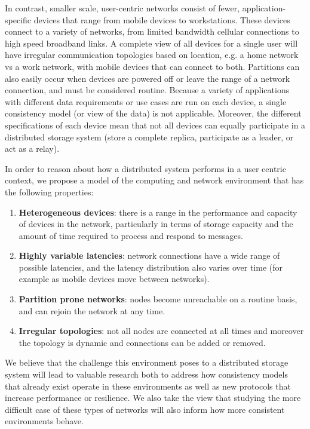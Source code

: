 \documentclass[letterpaper,twocolumn,10pt]{article}
\begin{document}
In contrast, smaller scale, user-centric networks consist of fewer, application-specific devices that range from mobile devices to workstations. These devices connect to a variety of networks, from limited bandwidth cellular connections to high speed broadband links. A complete view of all devices for a single user will have irregular communication topologies based on location, e.g. a home network vs a work network, with mobile devices that can connect to both. Partitions can also easily occur when devices are powered off or leave the range of a network connection, and must be considered routine. Because a variety of applications with different data requirements or use cases are run on each device, a single consistency model (or view of the data) is not applicable. Moreover, the different specifications of each device mean that not all devices can equally participate in a distributed storage system (store a complete replica, participate as a leader, or act as a relay).

In order to reason about how a distributed system performs in a user centric context, we propose a model of the computing and network environment that has the following properties:

\begin{enumerate}
    \item \textbf{Heterogeneous devices}: there is a range in the performance and capacity of devices in the network, particularly in terms of storage capacity and the amount of time required to process and respond to messages.
    \item \textbf{Highly variable latencies}: network connections have a wide range of possible latencies, and the latency distribution also varies over time (for example as mobile devices move between networks).
    \item \textbf{Partition prone networks}: nodes become unreachable on a routine basis, and can rejoin the network at any time.
    \item \textbf{Irregular topologies}: not all nodes are connected at all times and moreover the topology is dynamic and connections can be added or removed.
\end{enumerate}

We believe that the challenge this environment poses to a distributed storage system will lead to valuable research both to address how consistency models that already exist operate in these environments as well as new protocols that increase performance or resilience. We also take the view that studying the more difficult case of these types of networks will also inform how more consistent environments behave.
\end{document}
